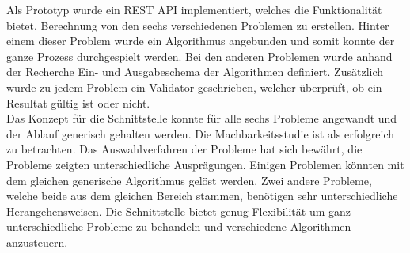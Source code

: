 Als Prototyp wurde ein REST API implementiert, welches die Funktionalität bietet, Berechnung von den sechs verschiedenen Problemen zu erstellen. Hinter einem dieser Problem wurde ein 
Algorithmus angebunden und somit konnte der ganze Prozess durchgespielt werden. Bei den anderen Problemen wurde anhand der Recherche Ein- und Ausgabeschema der Algorithmen definiert. 
Zusätzlich wurde zu jedem Problem ein Validator geschrieben, welcher überprüft, ob ein Resultat gültig ist oder nicht.\\

Das Konzept für die Schnittstelle konnte für alle sechs Probleme angewandt und der Ablauf generisch gehalten werden. Die Machbarkeitsstudie ist als erfolgreich zu betrachten. Das 
Auswahlverfahren der Probleme hat sich bewährt, die Probleme zeigten unterschiedliche Ausprägungen. Einigen Problemen könnten mit dem gleichen generische Algorithmus gelöst werden. Zwei 
andere Probleme, welche beide aus dem gleichen Bereich stammen, benötigen sehr unterschiedliche Herangehensweisen. Die Schnittstelle bietet genug Flexibilität um ganz unterschiedliche 
Probleme zu behandeln und verschiedene Algorithmen anzusteuern.